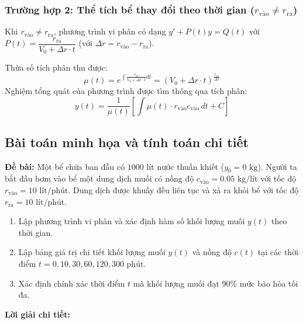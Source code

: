 \documentclass[14pt]{extarticle}
\begin{document}
\subsubsection{Trường hợp 2: Thể tích bể thay đổi theo thời gian ($r_{\text{vào}} \neq r_{\text{ra}}$)}
Khi $r_{\text{vào}} \neq r_{\text{ra}}$, phương trình vi phân có dạng $y' + P(t)y = Q(t)$ với $P(t) = \dfrac{r_{\text{ra}}}{V_0 + \Delta r \cdot t}$ (với $\Delta r = r_{\text{vào}} - r_{\text{ra}}$).

Thừa số tích phân thu được:
$$\mu(t) = e^{\int \frac{r_{\text{ra}}}{V_0 + \Delta r \cdot t} dt} = \left(V_0 + \Delta r \cdot t\right)^{\frac{r_{\text{ra}}}{\Delta r}}$$
Nghiệm tổng quát của phương trình được tìm thông qua tích phân:
\begin{equation}
y(t) = \frac{1}{\mu(t)} \left[ \int \mu(t) \cdot r_{\text{vào}} c_{\text{vào}} \, dt + C \right]
\end{equation}

\subsection{Bài toán minh họa và tính toán chi tiết}

\textbf{Đề bài:} Một bể chứa ban đầu có $1000\text{ lít}$ nước thuần khiết ($y_0 = 0\text{ kg}$). Người ta bắt đầu bơm vào bể một dung dịch muối có nồng độ $c_{\text{vào}} = 0.05\text{ kg/lít}$ với tốc độ $r_{\text{vào}} = 10\text{ lít/phút}$. Dung dịch được khuấy đều liên tục và xả ra khỏi bể với tốc độ $r_{\text{ra}} = 10\text{ lít/phút}$.

\begin{enumerate}
    \item Lập phương trình vi phân và xác định hàm số khối lượng muối $y(t)$ theo thời gian.
    \item Lập bảng giá trị chi tiết khối lượng muối $y(t)$ và nồng độ $c(t)$ tại các thời điểm $t = 0, 10, 30, 60, 120, 300\text{ phút}$.
    \item Xác định chính xác thời điểm $t$ mà khối lượng muối đạt $90\%$ mức bão hòa tối đa.
\end{enumerate}

\textbf{Lời giải chi tiết:}
\end{document}

